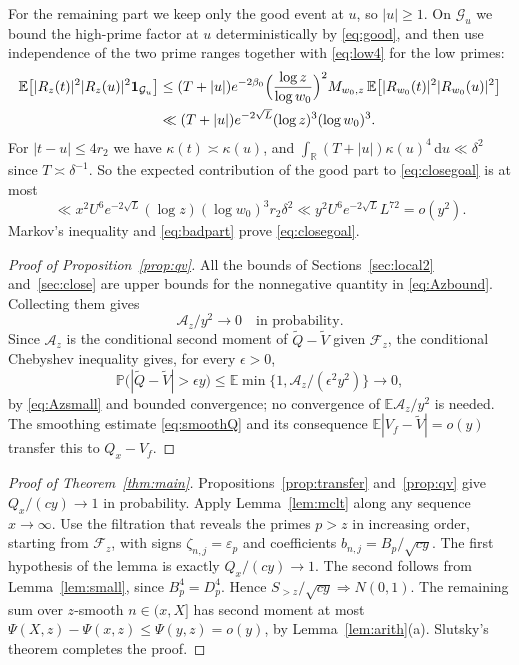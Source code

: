 \documentclass[11pt]{amsart}
\theoremstyle{remark}
\numberwithin{equation}{section}
\newcommand{\E}{\mathbb{E}}
\renewcommand{\P}{\mathbb{P}}
\newcommand{\R}{\mathbb{R}}
\newcommand{\one}{\mathbf{1}}
\newcommand{\dd}{\,\mathrm{d}}
\newcommand{\tQ}{\widetilde{Q}}
\newcommand{\tV}{\widetilde{V}}
\begin{document}
For the remaining part we keep only the good event at $u$, so $|u|\ge1$. On $\mathcal G_u$ we bound the high-prime factor at $u$ deterministically by \eqref{eq:good}, and then use independence of the two prime ranges together with \eqref{eq:low4} for the low primes:
\begin{align}
\E\bigl[|R_z(t)|^2|R_z(u)|^2\one_{\mathcal G_u}\bigr]&\le(T+|u|)e^{-2\beta_0}\Bigl(\frac{\log z}{\log w_0}\Bigr)^2M_{w_0,z}\,\E\bigl[|R_{w_0}(t)|^2|R_{w_0}(u)|^2\bigr]\notag\\
&\ll(T+|u|)e^{-2\sqrt L}(\log z)^3(\log w_0)^3 .\label{eq:goodpart}
\end{align}
For $|t-u|\le4r_2$ we have $\kappa(t)\asymp\kappa(u)$, and $\int_\R(T+|u|)\kappa(u)^4\dd u\ll\delta^2$ since $T\asymp\delta^{-1}$. So the expected contribution of the good part to \eqref{eq:closegoal} is at most
\[
\ll x^2U^6e^{-2\sqrt L}(\log z)(\log w_0)^3r_2\delta^2\ll y^2U^6e^{-2\sqrt L}L^{72}=o(y^2).
\]
Markov's inequality and \eqref{eq:badpart} prove \eqref{eq:closegoal}.

\begin{proof}[Proof of Proposition~\ref{prop:qv}]
All the bounds of Sections~\ref{sec:local2} and~\ref{sec:close} are upper bounds for the nonnegative quantity in \eqref{eq:Azbound}. Collecting them gives
\begin{equation}\label{eq:Azsmall}
\mathcal A_z/y^2\longrightarrow0\quad\text{in probability}.
\end{equation}
Since $\mathcal A_z$ is the conditional second moment of $\tQ-\tV$ given $\mathcal F_z$, the conditional Chebyshev inequality gives, for every $\epsilon>0$,
\[
\P\bigl(|\tQ-\tV|>\epsilon y\bigr)\le\E\min\bigl\{1,\mathcal A_z/(\epsilon^2y^2)\bigr\}\longrightarrow0 ,
\]
by \eqref{eq:Azsmall} and bounded convergence; no convergence of $\E\mathcal A_z/y^2$ is needed. The smoothing estimate \eqref{eq:smoothQ} and its consequence $\E|V_f-\tV|=o(y)$ transfer this to $Q_x-V_f$.
\end{proof}

\begin{proof}[Proof of Theorem~\ref{thm:main}]
Propositions~\ref{prop:transfer} and~\ref{prop:qv} give $Q_x/(cy)\to1$ in probability. Apply Lemma~\ref{lem:mclt} along any sequence $x\to\infty$. Use the filtration that reveals the primes $p>z$ in increasing order, starting from $\mathcal F_z$, with signs $\zeta_{n,j}=\varepsilon_p$ and coefficients $b_{n,j}=B_p/\sqrt{cy}$. The first hypothesis of the lemma is exactly $Q_x/(cy)\to1$. The second follows from Lemma~\ref{lem:small}, since $B_p^4=D_p^4$. Hence $S_{>z}/\sqrt{cy}\Rightarrow N(0,1)$. The remaining sum over $z$-smooth $n\in(x,X]$ has second moment at most $\Psi(X,z)-\Psi(x,z)\le\Psi(y,z)=o(y)$, by Lemma~\ref{lem:arith}(a). Slutsky's theorem completes the proof.
\end{proof}
\end{document}
